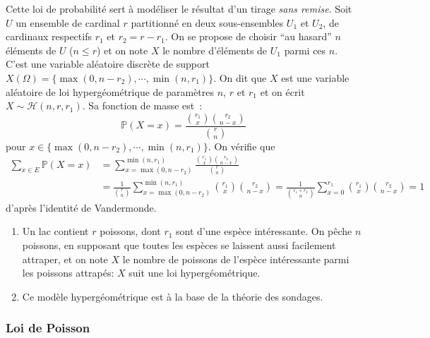Cette loi de probabilité sert à modéliser le résultat d'un tirage \textit{sans remise}. Soit $U$ un ensemble de cardinal $r$ partitionné en deux sous-ensembles $U_1$ et $U_2$, de cardinaux respectifs $r_1$ et $r_2=r-r_1$. On se propose de choisir ``au hasard'' $n$ éléments de $U$ ($n \leq r$) et on note $X$ le nombre d'éléments de $U_1$ parmi ces $n$. C'est une variable aléatoire discrète de support $X(\Omega) = \{ \max(0, n-r_2),\cdots, \min(n,r_1) \} $. On dit que $X$ est une variable aléatoire de loi hypergéométrique de paramètres $n$, $r$ et $r_1$ et on écrit $X \sim \mathcal{H}(n,r,r_1)$. Sa fonction de masse est~: 
\[ \mathbb{P}(X=x) = \frac{\binom{r_1}{x} \binom{r_2}{n-x}}{\binom r n} \]
pour $x \in \{ \max(0, n-r_2),\cdots, \min(n,r_1) \}$.
 \sld{\vfill\pagebreak[5]}%
On vérifie que 
\begin{align*}
\sum_{x \in E} \mathbb{P}(X=x) & =  \sum_{x=\max(0, n-r_2)}^{\min(n,r_1)} \frac{\binom{r_1}{x} \binom{r_2}{n-x}}{\binom r n} \\ & =  \frac{1}{\binom r n} \sum_{x=\max(0, n-r_2)}^{\min(n,r_1)} \binom{r_1}{x} \binom{r_2}{n-x}  = \frac{1}{\binom{r_1+r_2}{n} } \sum_{x=0}^{r_1} \binom{r_1}{x} \binom{r_2}{n-x} = 1	
\end{align*}
d'après l'identité de Vandermonde.
 \sld{\vfill\pagebreak[5]}%
\begin{center}
	
\end{center}
 \sld{\vfill\pagebreak[5]}%
\begin{exemple}
	\begin{enumerate}
		\item Un lac contient $r$ poissons, dont $r_1$ sont d'une espèce intéressante. On pêche $n$ poissons, en supposant que toutes les espèces se laissent aussi facilement attraper, et on note $X$ le nombre de poissons de l'espèce intéressante parmi les poissons attrapés: $X$ suit une loi hypergéométrique.
		\item Ce modèle hypergéométrique est à la base de la théorie des sondages.
	\end{enumerate}
\end{exemple}

 \sld{\vfill\pagebreak[5]}%
\subsubsection{Loi de Poisson}

